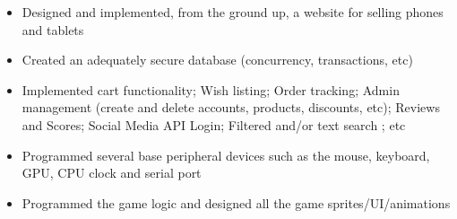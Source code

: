 \documentclass[10pt,a4paper]{altacv}
\begin{document}
\vspace{2mm}

\begin{itemize}
    \item Designed and implemented, from the ground up, a website for selling phones and tablets
    \item Created an adequately secure database (concurrency, transactions, etc)
    \item Implemented cart functionality; Wish listing; Order tracking; Admin management (create and delete accounts, products, discounts, etc); Reviews and Scores; Social Media API Login; Filtered and/or text search ; etc
\end{itemize}

\vspace{2mm}

\begin{itemize}
    \item Programmed several base peripheral devices such as the mouse, keyboard, GPU, CPU clock and serial port
    \item Programmed the game logic and designed all the game sprites/UI/animations 
\end{itemize}

\clearpage


\end{document}
